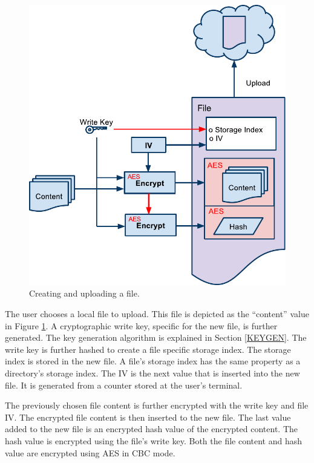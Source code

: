 \documentclass[pdftex,english,10pt,b5paper,twoside]{book}
\begin{document}
\begin{figure}[h!]
    \centering
    \includegraphics[width=\columnwidth]{CryptoCreateFile.pdf}
    \caption{Creating and uploading a file. }
    \label{fig:CS:CF}
\end{figure}

The user chooses a local file to upload. This file is depicted as the
``content'' value in Figure \ref{fig:CS:CF}. A cryptographic write key, specific
for the new file, is further generated. The key generation algorithm is
explained in Section \ref{KEYGEN}. The write key is further hashed to create a
file specific storage index. The storage index is stored in the new file. A
file's storage index has the same property as a directory's storage index. The
\ac{IV} is the next value that is inserted into the new file. It is
generated from a counter stored at the user's terminal.

The previously chosen file content is further encrypted with the write key and
file \ac{IV}. The encrypted file content is then inserted to the new file. The last
value added to the new file is an encrypted hash value of the encrypted content.
The hash value is encrypted using the file's write key. Both the file content
and hash value are encrypted using \ac{AES} in \ac{CBC} mode.
\end{document}
